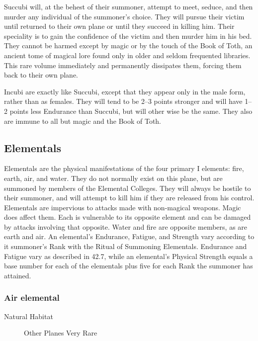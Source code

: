 \begin{multicols*}{2}
\begin{description}
\setlength\itemsep{0pt}

\item[Comments]Succubi will, at the behest of their summoner, attempt to meet,
seduce, and then murder any individual of the summoner's choice.  They
will pursue their victim until returned to their own plane or until
they succeed in killing him. Their speciality is to gain the
confidence of the victim and then murder him in his bed.  They cannot
be harmed except by magic or by the touch of the Book of Toth, an
ancient tome of magical lore found only in older and seldom frequented
libraries.  This rare volume immediately and permanently dissipates
them, forcing them back to their own plane.

Incubi are exactly like Succubi, except that they appear only in the
male form, rather than as females.  They will tend to be 2--3 points
stronger and will have 1--2 points less Endurance than Succubi, but
will other wise be the same.  They also are immune to all but magic
and the Book of Toth.

\end{description}

\subsection{Elementals}
Elementals are the physical manifestations of the four primary I
elements: fire, earth, air, and water. They do not normally exist on
this plane, but are summoned by members of the Elemental
Colleges. They will always be hostile to their summoner, and will
attempt to kill him if they are released from his control.  Elementals
are impervious to attacks made with non-magical weapons. Magic does
affect them. Each is vulnerable to its opposite element and can be
damaged by attacks involving that opposite. Water and fire are
opposite members, as are earth and air.  An elemental's Endurance,
Fatigue, and Strength vary according to it summoner's Rank with the
Ritual of Summoning Elementals. Endurance and Fatigue vary as
described in 42.7, while an elemental's Physical Strength equals a
base number for each of the elementals plus five for each Rank the
summoner has attained.

\subsubsection{Air elemental}

\begin{description}
\item[Natural Habitat] Other Planes Very Rare


\end{description}
\end{multicols*}
